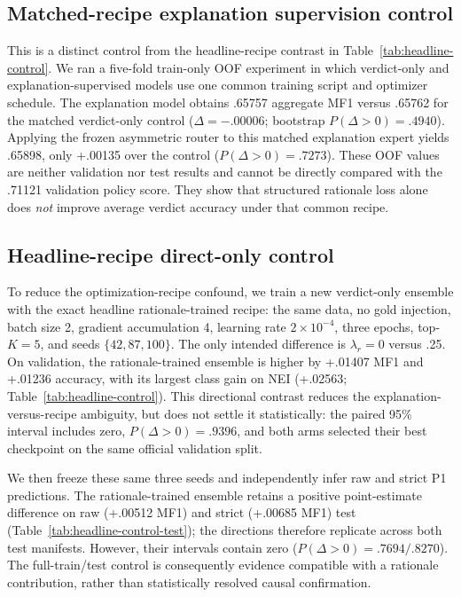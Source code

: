 \documentclass[11pt]{article}
\begin{document}
\subsection{Matched-recipe explanation supervision control}\label{sec:matched-exp}
This is a distinct control from the headline-recipe contrast in Table~\ref{tab:headline-control}. We ran a five-fold train-only OOF experiment in which verdict-only and explanation-supervised models use one common training script and optimizer schedule. The explanation model obtains .65757 aggregate MF1 versus .65762 for the matched verdict-only control ($\Delta=-.00006$; bootstrap $P(\Delta>0)=.4940$). Applying the frozen asymmetric router to this matched explanation expert yields .65898, only +.00135 over the control ($P(\Delta>0)=.7273$). These OOF values are neither validation nor test results and cannot be directly compared with the .71121 validation policy score. They show that structured rationale loss alone does \emph{not} improve average verdict accuracy under that common recipe.

\subsection{Headline-recipe direct-only control}\label{sec:headline-control}
To reduce the optimization-recipe confound, we train a new verdict-only ensemble with the exact headline rationale-trained recipe: the same data, no gold injection, batch size 2, gradient accumulation 4, learning rate $2\times10^{-4}$, three epochs, top-$K=5$, and seeds $\{42,87,100\}$. The only intended difference is $\lambda_r=0$ versus .25. On validation, the rationale-trained ensemble is higher by +.01407 MF1 and +.01236 accuracy, with its largest class gain on \textsc{NEI} (+.02563; Table~\ref{tab:headline-control}). This directional contrast reduces the explanation-versus-recipe ambiguity, but does not settle it statistically: the paired 95\% interval includes zero, $P(\Delta>0)=.9396$, and both arms selected their best checkpoint on the same official validation split.

We then freeze these same three seeds and independently infer raw and strict P1 predictions. The rationale-trained ensemble retains a positive point-estimate difference on raw (+.00512 MF1) and strict (+.00685 MF1) test (Table~\ref{tab:headline-control-test}); the directions therefore replicate across both test manifests. However, their intervals contain zero ($P(\Delta>0)=.7694/.8270$). The full-train/test control is consequently evidence compatible with a rationale contribution, rather than statistically resolved causal confirmation.
\end{document}

